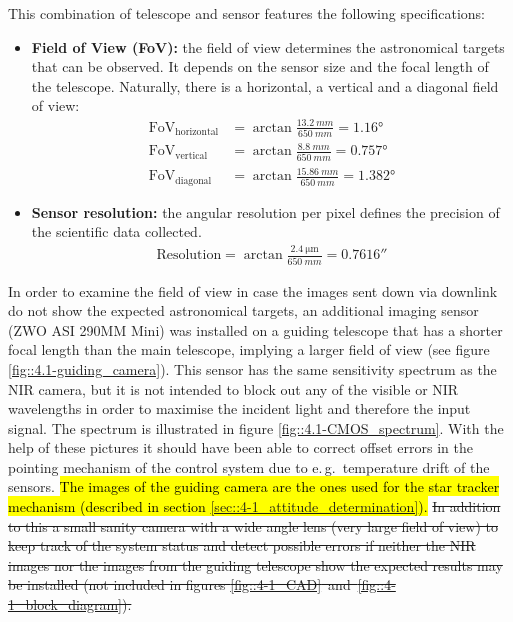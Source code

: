 This combination of telescope and sensor features the following specifications:

\begin{itemize}
	\item \textbf{Field of View (FoV):} the field of view determines the astronomical targets that can be observed. It depends on the sensor size and the focal length of the telescope. Naturally, there is a horizontal, a vertical and a diagonal field of view:
	\begin{align}
		\text{FoV}_\text{horizontal} &= \arctan \frac{\SI{13.2}{mm}}{\SI{650}{mm}} = \ang{1,16} \\
		\text{FoV}_\text{vertical} &= \arctan \frac{\SI{8.8}{mm}}{\SI{650}{mm}} = \ang{0,757} \\
		\text{FoV}_\text{diagonal} &= \arctan \frac{\SI{15,86}{mm}}{\SI{650}{mm}} = \ang{1,382}
	\end{align}
	\item \textbf{Sensor resolution:} the angular resolution per pixel defines the precision of the scientific data collected.
	\begin{align}
		\text{Resolution} = \arctan \frac{\SI{2,4}{\um}}{\SI{650}{mm}} %
		 = \ang{;;0,7616}
	\end{align}
\end{itemize}

In order to examine the field of view in case the images sent down via downlink do not show the expected astronomical targets, an additional imaging sensor (ZWO ASI 290MM Mini) was installed on a guiding telescope that has a shorter focal length than the main telescope, implying a larger field of view (see figure \ref{fig::4.1-guiding_camera}). This sensor has the same sensitivity spectrum as the NIR camera, but it is not intended to block out any of the visible or NIR wavelengths in order to maximise the incident light and therefore the input signal. The spectrum is illustrated in figure \ref{fig::4.1-CMOS_spectrum}. With the help of these pictures it should have been able to correct offset errors in the pointing mechanism of the control system due to e.\,g.~temperature drift of the sensors. \hl{The images of the guiding camera are the ones used for the star tracker mechanism (described in section \mbox{\ref{sec::4-1_attitude_determination}}).} 
\st{In addition to this a small sanity camera with a wide angle lens (very large field of view) to keep track of the system status and detect possible errors if neither the NIR images nor the images from the guiding telescope show the expected results may be installed (not included in figures \mbox{\ref{fig::4-1_CAD} and \ref{fig::4-1_block_diagram}}).}




